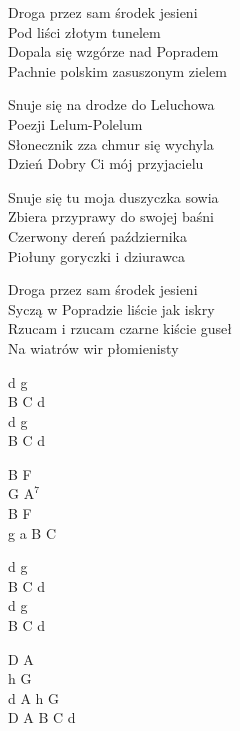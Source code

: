 \begin{text}
    Droga przez sam środek jesieni\\
    Pod liści złotym tunelem\\
    Dopala się wzgórze nad Popradem\\
    Pachnie polskim zasuszonym zielem

    \vin Snuje się na drodze do Leluchowa\\
    \vin Poezji Lelum-Polelum\\
    \vin Słonecznik zza chmur się wychyla\\
    \vin Dzień Dobry Ci mój przyjacielu

    Snuje się tu moja duszyczka sowia\\
    Zbiera przyprawy do swojej baśni\\
    Czerwony dereń października\\
    Piołuny goryczki i dziurawca

    Droga przez sam środek jesieni\\
    Syczą w Popradzie liście jak iskry\\
    Rzucam i rzucam czarne kiście guseł\\
    Na wiatrów wir płomienisty
\end{text}
\begin{chord}
    d g\\
    B C d\\
    d g\\
    B C d

    B F\\
    G $\mathrm{A^7}$\\
    B F\\
    g a B C

    d g\\
    B C d\\
    d g\\
    B C d

    D A\\
    h G\\
    d A h G\\
    D A B C d
\end{chord}
